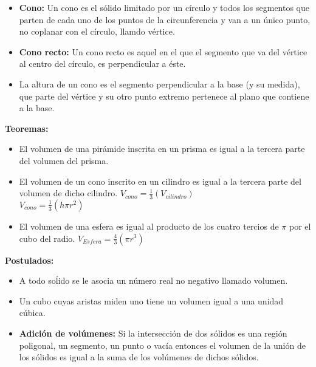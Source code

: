 \documentclass[•]{article}
\begin{document}
\begin{flushleft}
\begin{itemize}
			\item \textbf{Cono: }Un cono es el s\'olido limitado por un c\'irculo y todos los segmentos que parten de cada uno de los puntos de la circunferencia y van a un \'unico punto, no coplanar con el c\'irculo, llamdo v\'ertice.
			
			\item \textbf{Cono recto: }Un cono recto es aquel en el que el segmento que va del v\'ertice al centro del c\'irculo, es perpendicular a \'este.
			
			\item La altura de un cono es el segmento perpendicular a la base (y su medida), que parte del v\'ertice y su otro punto extremo pertenece al plano que contiene a la base.
		\end{itemize}				
		
		
		
		\textbf{Teoremas: }
		
		\begin{itemize}
			\item El volumen de una pir\'amide inscrita en un prisma es igual a la tercera parte del volumen del prisma.
			
			\item El volumen de un cono inscrito en un cilindro es igual a la tercera parte del volumen de dicho cilindro. $V_{cono}=\frac{1}{3}(V_{cilindro})$ \\
			$V_{cono}=\frac{1}{3}(h\pi r^2)$
			\item El volumen de una esfera es igual al producto de los cuatro tercios de $\pi$ por el cubo del radio. $V_{Esfera} = \frac{4}{3}(\pi r^3)$ 
		\end{itemize}
		
		\textbf{Postulados: }
		\begin{itemize}
			\item A todo so\'lido se le asocia un n\'umero real no negativo llamado volumen.
			
			\item Un cubo cuyas aristas miden uno tiene un volumen igual a una unidad c\'ubica.
			
			\item \textbf{Adici\'on de vol\'umenes: } Si la intersecci\'on de dos s\'olidos es una regi\'on poligonal, un segmento, un punto o vac\'ia entonces el volumen de la uni\'on de los s\'olidos es igual a la suma de los vol\'umenes de dichos s\'olidos.
			
			
		\end{itemize}
	\end{flushleft}
\end{document}
